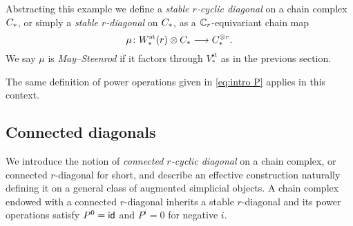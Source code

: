 Abstracting this example we define a \emph{stable $r$-cyclic diagonal} on a chain complex $C_{*}$, or simply a \textit{stable $r$-diagonal} on $C_{*}$, as a $\mathbb{C}_r$-equivariant chain map
\[
\mu \colon W^{\mathrm{st}}_{*}(r) \otimes C_{*} \longrightarrow C_{*}^{\otimes r}.
\]
We say $\mu$ is \textit{May--Steenrod} if it factors through $V_*^\mathrm{st}$ as in the previous section.

The same definition of power operations given in \cref{eq:intro P} applies in this context.



\subsection{Connected diagonals}

We introduce the notion of \emph{connected $r$-cyclic diagonal} on a chain complex, or connected $r$-diagonal for short, and describe an effective construction naturally defining it on a general class of augmented simplicial objects.
A chain complex endowed with a connected $r$-diagonal inherits a stable $r$-diagonal and its power operations satisfy $P^0 = \mathsf{id}$ and $P^i = 0$ for negative $i$.

